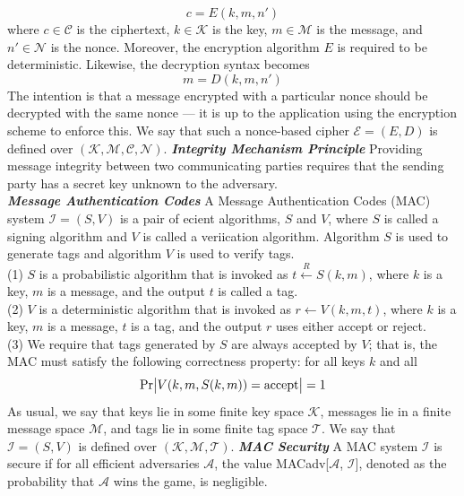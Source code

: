 \documentclass[a4paper,12pt,UTF8]{ctexart}
\begin{document}
\begin{spacing}{1.1}
\begin{equation}
c=E(k,m,n')
\end{equation}
\indent where $c\in{\mathcal{C}}$ is the ciphertext, $k\in{\mathcal{K}}$ is the key, $m\in{\mathcal{M}}$ is the message, and $n'\in{\mathcal{N}}$ is the nonce. Moreover, the encryption algorithm $E$ is required to be deterministic. Likewise, the decryption syntax becomes 
\begin{equation}
m=D(k,m,n')
\end{equation}
\indent The intention is that a message encrypted with a particular nonce should be decrypted with the same nonce --- it is up to the application using the encryption scheme to enforce this. We say that such a nonce-based cipher $\mathcal{E} =(E,D)$ is defined over $(\mathcal{K},\mathcal{M},\mathcal{C},\mathcal{N})$. \vspace{3mm}
\newline\indent\emph{\textbf{Integrity Mechanism Principle}} Providing message integrity between two communicating parties requires that the sending party has a secret key unknown to the adversary.\vspace{3mm}
\\\indent\emph{\textbf{Message Authentication Codes}}  A Message Authentication Codes (MAC) system $\mathcal{I} =(S,V)$ is a pair of ecient algorithms, $S$ and $V$, where $S$ is called a signing algorithm and $V$ is called a veriication algorithm. Algorithm $S$ is used to generate tags and algorithm $V$ is used to verify tags. 
\\\indent(1) $S$ is a probabilistic algorithm that is invoked as $t\xleftarrow{R}S(k,m)$, where $k$ is a key, $m$ is a message, and the output $t$ is called a tag.
\\\indent(2) $V$ is a deterministic algorithm that is invoked as $r\leftarrow V(k,m,t)$, where $k$ is a key, $m$ is a message, $t$ is a tag, and the output $r$ uses either accept or reject.
\\\indent(3) We require that tags generated by $S$ are always accepted by $V$; that is, the MAC must satisfy the following correctness property: for all keys $k$ and all 
\begin{equation}
{\rm Pr}\big|V(k,m,S(k,m)) = {\rm accept}\big| = 1
\end{equation}
\indent As usual, we say that keys lie in some finite key space $\mathcal{K}$, messages lie in a finite message space $\mathcal{M}$, and tags lie in some finite tag space $\mathcal{T}$. We say that $\mathcal{I}=(S,V)$ is defined over $(\mathcal{K},\mathcal{M},\mathcal{T})$. \vspace{3mm}
\newline\indent\emph{\textbf{MAC Security}} A MAC system $\mathcal{I}$ is secure if for all efficient adversaries $\mathcal{A}$, the value MACadv[$\mathcal{A}$, $\mathcal{I}$], denoted as the probability that $\mathcal{A}$ wins the game, is negligible. \vspace{3mm}


\end{spacing}
\end{document}
